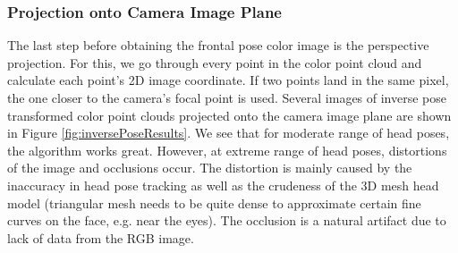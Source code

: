 \documentclass{ut-thesis}
\begin{document}
\subsubsection{Projection onto Camera Image Plane}
The last step before obtaining the frontal pose color image is the perspective projection.  For this, we go through every point in the color point cloud and calculate each point's 2D image coordinate.  If two points land in the same pixel, the one closer to the camera's focal point is used.  Several images of inverse pose transformed color point clouds projected onto the camera image plane are shown in Figure \ref{fig:inversePoseResults}.  We see that for moderate range of head poses, the algorithm works great.  However, at extreme range of head poses, distortions of the image and occlusions occur.  The distortion is mainly caused by the inaccuracy in head pose tracking as well as the crudeness of the 3D mesh head model (triangular mesh needs to be quite dense to approximate certain fine curves on the face, e.g. near the eyes).  The occlusion is a natural artifact due to lack of data from the RGB image.
\end{document}
